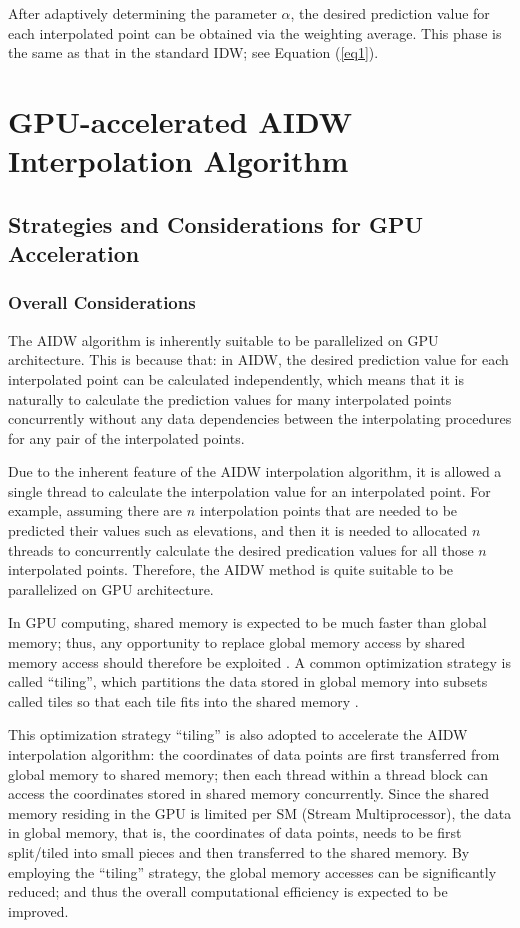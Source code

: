 \documentclass[fleqn,11pt]{wlscirep}
\begin{document}
After adaptively determining the parameter $\alpha $, the desired prediction 
value for each interpolated point can be obtained via the weighting average. 
This phase is the same as that in the standard IDW; see Equation (\ref{eq1}).


\section{GPU-accelerated AIDW Interpolation Algorithm}
\label{sec3}
\subsection{Strategies and Considerations for GPU Acceleration}

\subsubsection{Overall Considerations}

The AIDW algorithm is inherently suitable to be parallelized on GPU 
architecture. This is because that: in AIDW, the desired prediction value 
for each interpolated point can be calculated independently, which means 
that it is naturally to calculate the prediction values for many 
interpolated points concurrently without any data dependencies between the 
interpolating procedures for any pair of the interpolated points.

Due to the inherent feature of the AIDW interpolation algorithm, it is 
allowed a single thread to calculate the interpolation value for an 
interpolated point. For example, assuming there are $n$ interpolation points 
that are needed to be predicted their values such as elevations, and then it 
is needed to allocated $n$ threads to concurrently calculate the desired 
predication values for all those $n$ interpolated points. Therefore, the AIDW 
method is quite suitable to be parallelized on GPU architecture.

In GPU computing, shared memory is expected to be much faster than global 
memory; thus, any opportunity to replace global memory access by shared 
memory access should therefore be exploited \cite{06}. A common optimization 
strategy is called ``tiling'', which partitions the data stored in global 
memory into subsets called tiles so that each tile fits into the shared 
memory \cite{14}.

This optimization strategy ``tiling'' is also adopted to accelerate the AIDW 
interpolation algorithm: the coordinates of data points are first 
transferred from global memory to shared memory; then each thread within a 
thread block can access the coordinates stored in shared memory 
concurrently. Since the shared memory residing in the GPU is limited per SM 
(Stream Multiprocessor), the data in global memory, that is, the coordinates 
of data points, needs to be first split/tiled into small pieces and then 
transferred to the shared memory. By employing the ``tiling'' strategy, the 
global memory accesses can be significantly reduced; and thus the overall 
computational efficiency is expected to be improved.
\end{document}
